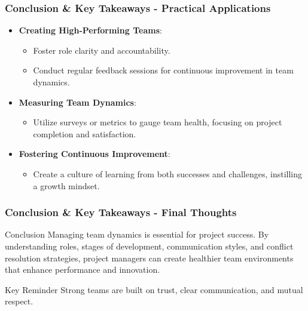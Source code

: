 \documentclass[aspectratio=169]{beamer}
\begin{document}
\begin{frame}[fragile]
    \frametitle{Conclusion \& Key Takeaways - Practical Applications}
    \begin{itemize}
        \item \textbf{Creating High-Performing Teams}:
        \begin{itemize}
            \item Foster role clarity and accountability.
            \item Conduct regular feedback sessions for continuous improvement in team dynamics.
        \end{itemize}
        
        \item \textbf{Measuring Team Dynamics}:
        \begin{itemize}
            \item Utilize surveys or metrics to gauge team health, focusing on project completion and satisfaction.
        \end{itemize}
        
        \item \textbf{Fostering Continuous Improvement}:
        \begin{itemize}
            \item Create a culture of learning from both successes and challenges, instilling a growth mindset.
        \end{itemize}
    \end{itemize}
\end{frame}

\begin{frame}[fragile]
    \frametitle{Conclusion \& Key Takeaways - Final Thoughts}
    \begin{block}{Conclusion}
        Managing team dynamics is essential for project success. By understanding roles, stages of development, communication styles, and conflict resolution strategies, project managers can create healthier team environments that enhance performance and innovation. 
    \end{block}
    \begin{block}{Key Reminder}
        Strong teams are built on trust, clear communication, and mutual respect.
    \end{block}
\end{frame}
\end{document}
